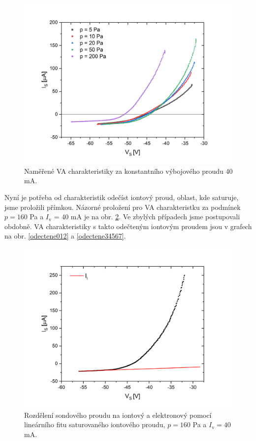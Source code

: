 \documentclass[a4paper,12pt]{article}
\begin{document}
\begin{figure}[h!]
	\centering
	\includegraphics[width=145mm]{namerene34567.png}
	\caption{Naměřené VA charakteristiky za konstantního výbojového proudu 40 \si{\milli\ampere}.}
	\label{namerene34567}
\end{figure}

\newpage
Nyní je potřeba od charakteristik odečíst iontový proud, oblast, kde saturuje, 
jsme proložili 
přímkou. Názorné proložení pro VA
charakteristku za podmínek $p = 160$ \si{\pascal} a $I_\text{v}$ = 40 \si{\milli\ampere} je na obr. \ref{iiont}. Ve zbylých případech
jsme postupovali obdobně. VA charakteristiky s takto odečteným iontovým proudem jsou v grafech na obr. \ref{odectene012} a
\ref{odectene34567}.

\begin{figure}[h]
	\centering
	\includegraphics[width=145mm]{iiont.png}
	\caption{Rozdělení sondového proudu na iontový a elektronový pomocí 
	lineárního fitu saturovaného iontového proudu, $p = 160$ \si{\pascal} a 
	$I_\text{v} = 40$ \si{\milli\ampere}.}
	\label{iiont}
\end{figure}
\end{document}
